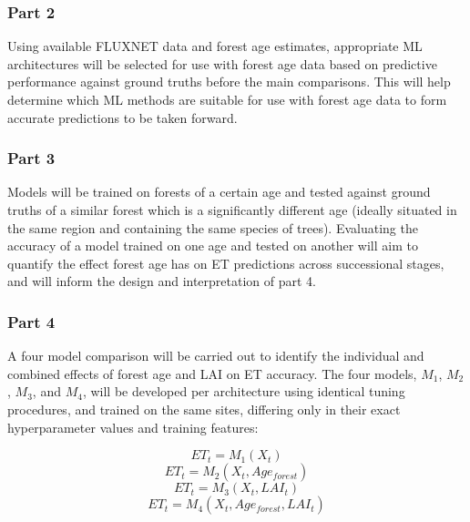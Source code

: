 \subsubsection*{Part 2}
Using available FLUXNET data and forest age estimates, appropriate ML architectures will be selected for use with forest age data based on predictive performance against ground truths before the main comparisons. This will help determine which ML methods are suitable for use with forest age data to form accurate predictions to be taken forward.


\subsubsection*{Part 3}
Models will be trained on forests of a certain age and tested against ground truths of a similar forest which is a significantly different age (ideally situated in the same region and containing the same species of trees). Evaluating the accuracy of a model trained on one age and tested on another will aim to quantify the effect forest age has on ET predictions across successional stages, and will inform the design and interpretation of part 4.


\subsubsection*{Part 4}
A four model comparison will be carried out to identify the individual and combined effects of forest age and LAI on ET accuracy. The four models, $M_1$, $M_2$, $M_3$, and $M_4$,  will be developed per architecture using identical tuning procedures, and trained on the same sites, differing only in their exact hyperparameter values and training features:

\vspace{-1em}
\begin{equation}
	ET_t = M_1\left(X_t\right)
	\label{eq:og}
\end{equation}
\begin{equation}
	ET_t = M_2(X_t, Age_{\textit{forest}})
	\label{eq:mine2}
\end{equation}
\begin{equation}
	ET_t = M_3(X_t, LAI_t)
	\label{eq:mine}
\end{equation}
\begin{equation}
	ET_t = M_4(X_t, Age_{\textit{forest}}, LAI_t)
	\label{eq:mine3}
\end{equation}



